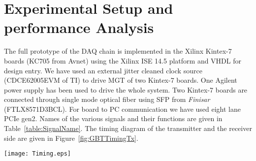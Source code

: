 \documentclass[10pt, conference, compsocconf]{IEEEtran}
\begin{document}
\section{Experimental Setup and performance Analysis} \label{PerformenceEvoluation}
The full prototype of the DAQ chain is implemented in the Xilinx Kintex-7 boards (KC705 from Avnet) using the Xilinx ISE 14.5 platform and VHDL for design entry. We have used an external jitter cleaned clock source (CDCE62005EVM of TI) to drive MGT of two Kintex-7 boards. One Agilent power supply has been used to drive the whole system. Two Kintex-7 boards are connected through single mode optical fiber using SFP from \textit{Finisar} (FTLX8571D3BCL). For board to PC communication we have used eight lane PCIe gen2. Names of the various signals and their functions are given in Table~\ref{table:SignalName}.
The timing diagram of the transmitter and the receiver side are given in Figure~\ref{fig:GBTTimingTx}. 
\begin{figure*}[htb]
\texttt{[image: Timing.eps]}
\caption{Timing diagram of the transmitter and receiver signals }
\label{fig:GBTTimingTx}
\end{figure*}
\end{document}
